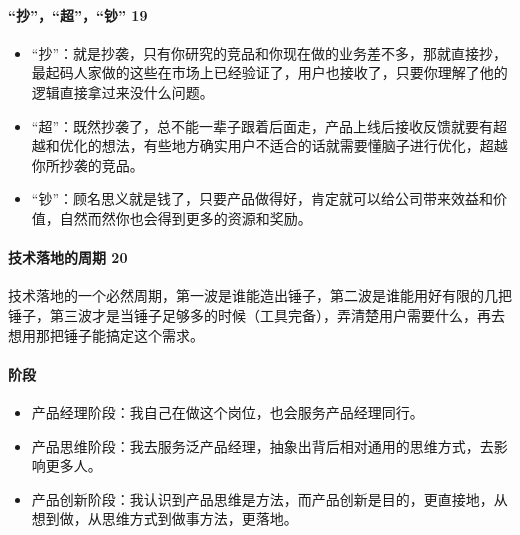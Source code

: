 \documentclass[letterpaper,10pt,english]{sphinxmanual}
\begin{document}
\paragraph{“抄”，“超”，“钞” 19\sphinxfootnotemark[205]}
\label{\detokenize{chapter_introduction/PM:id57}}%
\begin{footnotetext}[205]\sphinxAtStartFootnote
{}
%
\end{footnotetext}\ignorespaces \begin{itemize}
\item {} 
“抄”：就是抄袭，只有你研究的竞品和你现在做的业务差不多，那就直接抄，最起码人家做的这些在市场上已经验证了，用户也接收了，只要你理解了他的逻辑直接拿过来没什么问题。

\item {} 
“超”：既然抄袭了，总不能一辈子跟着后面走，产品上线后接收反馈就要有超越和优化的想法，有些地方确实用户不适合的话就需要懂脑子进行优化，超越你所抄袭的竞品。

\item {} 
“钞”：顾名思义就是钱了，只要产品做得好，肯定就可以给公司带来效益和价值，自然而然你也会得到更多的资源和奖励。

\end{itemize}


\paragraph{技术落地的周期 20\sphinxfootnotemark[206]}
\label{\detokenize{chapter_introduction/PM:id58}}%
\begin{footnotetext}[206]\sphinxAtStartFootnote
{}
%
\end{footnotetext}\ignorespaces 
技术落地的一个必然周期，第一波是谁能造出锤子，第二波是谁能用好有限的几把锤子，第三波才是当锤子足够多的时候（工具完备），弄清楚用户需要什么，再去想用那把锤子能搞定这个需求。


\paragraph{阶段}
\label{\detokenize{chapter_introduction/PM:id59}}\begin{itemize}
\item {} 
产品经理阶段：我自己在做这个岗位，也会服务产品经理同行。

\item {} 
产品思维阶段：我去服务泛产品经理，抽象出背后相对通用的思维方式，去影响更多人。

\item {} 
产品创新阶段：我认识到产品思维是方法，而产品创新是目的，更直接地，从想到做，从思维方式到做事方法，更落地。

\end{itemize}
\end{document}
